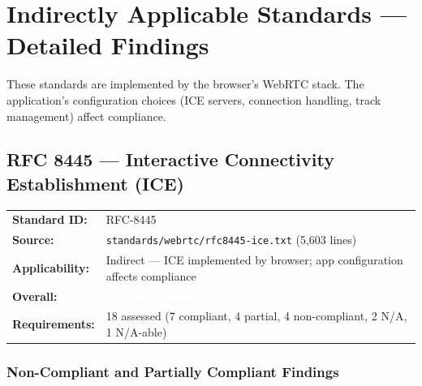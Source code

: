 \documentclass[11pt,letterpaper]{article}
\newcommand{\partiallycompliant}{\colorbox{noncompliant}{\textcolor{white}{\textbf{\small~Partially Compliant~}}}}
\begin{document}
\newpage

\section{Indirectly Applicable Standards --- Detailed Findings}

These standards are implemented by the browser's WebRTC stack. The application's configuration choices (ICE servers, connection handling, track management) affect compliance.

\subsection{RFC 8445 --- Interactive Connectivity Establishment (ICE)}

\begin{tabular}{ll}
\textbf{Standard ID:} & RFC-8445 \\
\textbf{Source:} & \texttt{standards/webrtc/rfc8445-ice.txt} (5,603 lines) \\
\textbf{Applicability:} & Indirect --- ICE implemented by browser; app configuration affects compliance \\
\textbf{Overall:} & \partiallycompliant \\
\textbf{Requirements:} & 18 assessed (7 compliant, 4 partial, 4 non-compliant, 2 N/A, 1 N/A-able) \\
\end{tabular}

\subsubsection{Non-Compliant and Partially Compliant Findings}
\end{document}
